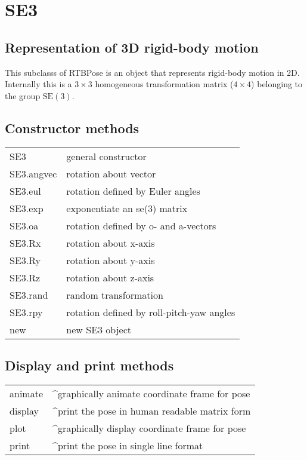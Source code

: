 \hypertarget{SE3}{\section*{SE3}}
\subsection*{Representation of 3D rigid-body motion}


This subclasss of RTBPose is an object that represents rigid-body motion in 2D.
Internally this is a $3 \times 3$ homogeneous transformation matrix ($4 \times 4$) belonging to
the group $\mbox{SE}(3)$.


\subsection*{Constructor methods}
\begin{longtable}{lp{120mm}}
SE3 & general constructor\\ 
SE3.angvec & rotation about vector\\ 
SE3.eul & rotation defined by Euler angles\\ 
SE3.exp & exponentiate an se(3) matrix\\ 
SE3.oa & rotation defined by o- and a-vectors\\ 
SE3.Rx & rotation about x-axis\\ 
SE3.Ry & rotation about y-axis\\ 
SE3.Rz & rotation about z-axis\\ 
SE3.rand & random transformation\\ 
SE3.rpy & rotation defined by roll-pitch-yaw angles\\ 
new & new SE3 object\\ 
\end{longtable}\vspace{1ex}

\subsection*{Display and print methods}
\begin{longtable}{lp{120mm}}
animate & \textasciicircum graphically animate coordinate frame for pose\\ 
display & \textasciicircum print the pose in human readable matrix form\\ 
plot & \textasciicircum graphically display coordinate frame for pose\\ 
print & \textasciicircum print the pose in single line format\\ 
\end{longtable}\vspace{1ex}

